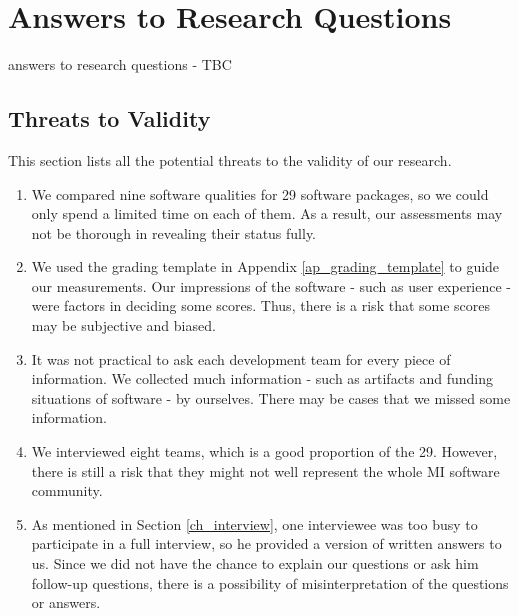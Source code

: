 \chapter{Answers to Research Questions}
\label{ch_answers}

answers to research questions - TBC

\section{Threats to Validity}

This section lists all the potential threats to the validity of our research.

\begin{enumerate}
\item We compared nine software qualities for 29 software packages, so we could only spend a limited time on each of them. As a result, our assessments may not be thorough in revealing their status fully.
\item We used the grading template in Appendix \ref{ap_grading_template} to guide our measurements. Our impressions of the software - such as user experience - were factors in deciding some scores. Thus, there is a risk that some scores may be subjective and biased.
\item It was not practical to ask each development team for every piece of information. We collected much information - such as artifacts and funding situations of software - by ourselves. There may be cases that we missed some information.
\item We interviewed eight teams, which is a good proportion of the 29. However, there is still a risk that they might not well represent the whole MI software community.
\item As mentioned in Section \ref{ch_interview}, one interviewee was too busy to participate in a full interview, so he provided a version of written answers to us. Since we did not have the chance to explain our questions or ask him follow-up questions, there is a possibility of misinterpretation of the questions or answers.
\end{enumerate}
